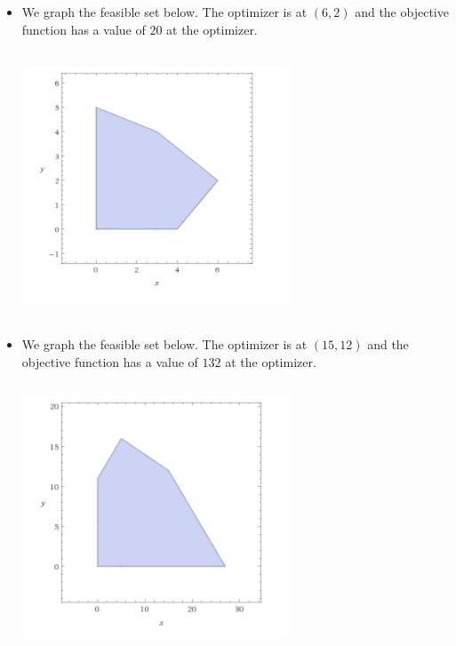 \documentclass[12pt]{article}
\newenvironment{problem}[2][Problem]{\begin{trivlist}
\item[\hskip \labelsep {\bfseries #1}\hskip \labelsep {\bfseries #2}]}{\end{trivlist}}
\begin{document}
\begin{problem}{8.2.}\hfill
\begin{itemize}
\item[(i)]We graph the feasible set below. The optimizer is at $(6, 2)$ and the objective function has a value of $20$ at the optimizer. 
\begin{center}
\includegraphics[width=8cm, height=8cm]{prob8i}
\end{center}
\item[(ii)]We graph the feasible set below. The optimizer is at $(15, 12)$ and the objective function has a value of $132$ at the optimizer. 
\begin{center}
\includegraphics[width=8cm, height=8cm]{prob8ii}
\end{center}
\end{itemize}
\end{problem}
\end{document}

